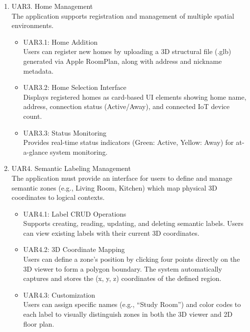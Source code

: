 \documentclass[conference]{IEEEtran}
\begin{document}
\begin{enumerate}
    \item [3)] UAR3. Home Management \\
    The application supports registration and management of multiple spatial environments.
    \begin{itemize}
        \item UAR3.1: Home Addition \\
        Users can register new homes by uploading a 3D structural file (.glb) generated via Apple RoomPlan, along with address and nickname metadata.

        \item UAR3.2: Home Selection Interface \\
        Displays registered homes as card-based UI elements showing home name, address, connection status (Active/Away), and connected IoT device count.

        \item UAR3.3: Status Monitoring \\
        Provides real-time status indicators (Green: Active, Yellow: Away) for at-a-glance system monitoring.
    \end{itemize}

    \item [4)] UAR4. Semantic Labeling Management \\
    The application must provide an interface for users to define and manage semantic zones (e.g., Living Room, Kitchen) which map physical 3D coordinates to logical contexts.
    \begin{itemize}
        \item UAR4.1: Label CRUD Operations \\
        Supports creating, reading, updating, and deleting semantic labels. Users can view existing labels with their current 3D coordinates.

        \item UAR4.2: 3D Coordinate Mapping \\
        Users can define a zone's position by clicking four points directly on the 3D viewer to form a polygon boundary. The system automatically captures and stores the (x, y, z) coordinates of the defined region.

        \item UAR4.3: Customization \\
        Users can assign specific names (e.g., ``Study Room'') and color codes to each label to visually distinguish zones in both the 3D viewer and 2D floor plan.
    \end{itemize}


\end{enumerate}
\end{document}
